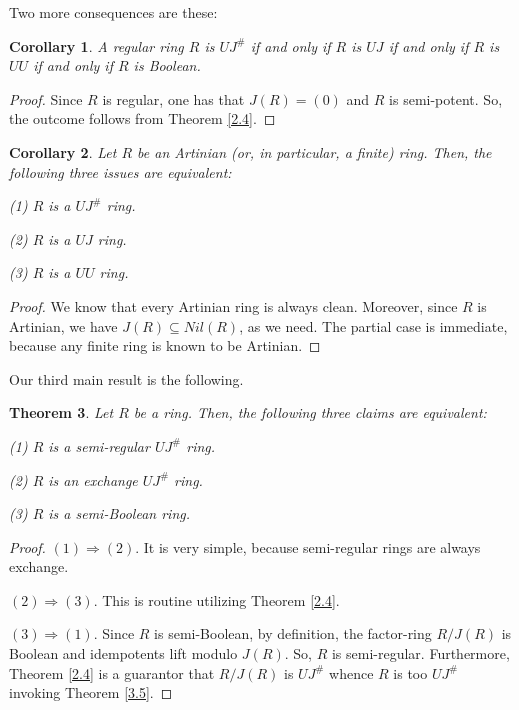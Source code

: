 \documentclass[12pt]{amsart}
\newtheorem{theorem}{Theorem}[section]
\newtheorem{corollary}[theorem]{Corollary}
\theoremstyle{definition}
\begin{document}
Two more consequences are these:

\begin{corollary}\label{2.5}
A regular ring \( R \) is $UJ^{\#}$ if and only if \( R \) is \( UJ \) if and only if \( R \) is \( UU \) if and only if \( R \) is Boolean.
\end{corollary}

\begin{proof}
Since $R$ is regular, one has that $J(R)=(0)$ and $R$ is semi-potent. So, the outcome follows from Theorem \ref{2.4}.	 \end{proof}

\begin{corollary}\label{2.7}
Let \( R \) be an Artinian (or, in particular, a finite) ring. Then, the following three issues are equivalent:

(1) \( R \) is a $UJ^{\#}$ ring.

(2) \( R \) is a \( UJ \) ring.

(3) \( R \) is a \( UU \) ring.
\end{corollary}

\begin{proof}
We know that every Artinian ring is always clean. Moreover, since \( R \) is Artinian, we have \( J(R) \subseteq Nil(R) \), as we need. The partial case is immediate, because any finite ring is known to be Artinian.
\end{proof}

Our third main result is the following.

\begin{theorem}\label{3.16}
Let \(R\) be a ring. Then, the following three claims are equivalent:

(1) \(R\) is a semi-regular $UJ^{\#}$ ring.

(2) \(R\) is an exchange $UJ^{\#}$ ring.

(3) \(R\) is a semi-Boolean ring.
\end{theorem}

\begin{proof}
\((1) \Rightarrow (2)\). It is very simple, because semi-regular rings are always exchange.
	
\((2) \Rightarrow (3)\). This is routine utilizing Theorem \ref{2.4}.
	
\((3) \Rightarrow (1)\). Since $R$ is semi-Boolean, by definition, the factor-ring $R/J(R)$ is Boolean and idempotents lift modulo $J(R)$. So, $R$ is semi-regular. Furthermore, Theorem \ref{2.4} is a guarantor that $R/J(R)$ is $UJ^{\#}$ whence $R$ is too $UJ^{\#}$ invoking Theorem \ref{3.5}.
\end{proof}
\end{document}
